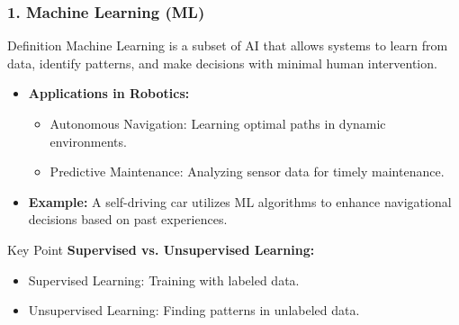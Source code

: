\documentclass[aspectratio=169]{beamer}
\begin{document}
\begin{frame}[fragile]
    \frametitle{1. Machine Learning (ML)}
    \begin{block}{Definition}
        Machine Learning is a subset of AI that allows systems to learn from data, identify patterns, and make decisions with minimal human intervention.
    \end{block}
    
    \begin{itemize}
        \item \textbf{Applications in Robotics:}
        \begin{itemize}
            \item Autonomous Navigation: Learning optimal paths in dynamic environments.
            \item Predictive Maintenance: Analyzing sensor data for timely maintenance.
        \end{itemize}
        \item \textbf{Example:} A self-driving car utilizes ML algorithms to enhance navigational decisions based on past experiences.
    \end{itemize}

    \begin{block}{Key Point}
        \textbf{Supervised vs. Unsupervised Learning:}
        \begin{itemize}
            \item Supervised Learning: Training with labeled data.
            \item Unsupervised Learning: Finding patterns in unlabeled data.
        \end{itemize}
    \end{block}
\end{frame}
\end{document}
